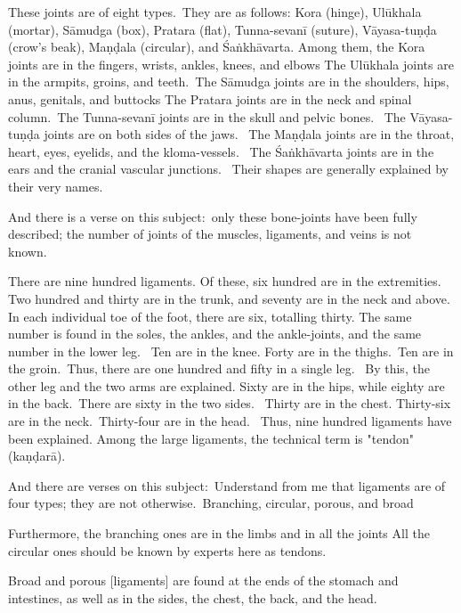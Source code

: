 \begin{translation}
\item[27]
These joints are of eight types. They are as follows: Kora (hinge), Ulūkhala (mortar), Sāmudga (box), Pratara (flat), Tunna-sevanī (suture), Vāyasa-tuṇḍa (crow's beak), Maṇḍala (circular), and Śaṅkhāvarta. Among them, the Kora joints are in the fingers, wrists, ankles, knees, and elbows The Ulūkhala joints are in the armpits, groins, and teeth. The Sāmudga joints are in the shoulders, hips, anus, genitals, and buttocks The Pratara joints are in the neck and spinal column. The Tunna-sevanī joints are in the skull and pelvic bones.  The Vāyasa-tuṇḍa joints are on both sides of the jaws.  The Maṇḍala joints are in the throat, heart, eyes, eyelids, and the kloma-vessels.  The Śaṅkhāvarta joints are in the ears and the cranial vascular junctions.  Their shapes are generally explained by their very names. 

\item[28]
And there is a verse on this subject: only these bone-joints have been fully described; the number of joints of the muscles, ligaments, and veins is not known.  


\item[29]
There are nine hundred ligaments. Of these, six hundred are in the extremities.  Two hundred and thirty are in the trunk, and seventy are in the neck and above.  In each individual toe of the foot, there are six, totalling thirty. The same number is found in the soles, the ankles, and the ankle-joints, and the same number in the lower leg.  Ten are in the knee. Forty are in the thighs. Ten are in the groin. Thus, there are one hundred and fifty in a single leg.  By this, the other leg and the two arms are explained. Sixty are in the hips, while eighty are in the back. There are sixty in the two sides.  Thirty are in the chest. Thirty-six are in the neck. Thirty-four are in the head.  Thus, nine hundred ligaments have been explained. Among the large ligaments, the technical term is "tendon" (kaṇḍarā). 


\item[30]
And there are verses on this subject: Understand from me that ligaments are of four types; they are not otherwise. Branching, circular, porous, and broad

\item[31]
Furthermore, the branching ones are in the limbs and in all the joints All the circular ones should be known by experts here as tendons. 
\item[32]
Broad and porous [ligaments] are found at the ends of the stomach and intestines, as well as in the sides, the chest, the back, and the head.


\end{translation}
